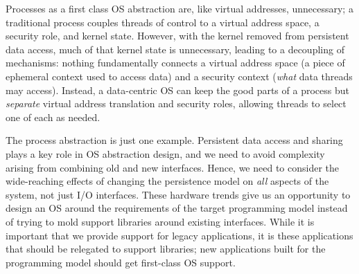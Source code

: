 Processes as a first class OS abstraction are, like virtual addresses, unnecessary; a traditional process couples
threads of control to a virtual address space, a security role, and kernel state.
However, with the kernel removed from
persistent data access, much of that kernel state is unnecessary,
leading to a decoupling of mechanisms:
nothing fundamentally connects a virtual address space
(a piece of ephemeral context used to access data) and a security context (\emph{what} data
threads may access).
Instead, a data-centric OS can keep the good parts of a process but \emph{separate} virtual address
translation and security roles, allowing threads to select one of each as needed.

The process abstraction is just one example. Persistent data access and sharing plays a key role in OS
abstraction design, and we need to avoid complexity arising from combining old and new interfaces.
Hence, we need to consider the
wide-reaching effects of changing the persistence model on \emph{all} aspects of the system, not
just I/O interfaces. These hardware trends give us an opportunity to design an OS around the requirements
of the target programming model instead of trying to mold support libraries around existing
interfaces. While it is important that we provide support for legacy applications,
it is these applications that should be relegated to support libraries; new applications built for
the programming model should get first-class OS support.


